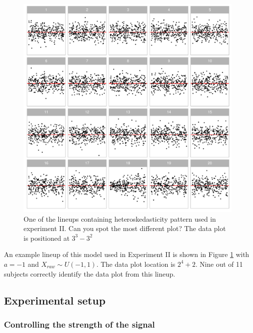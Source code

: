 \documentclass[]{interact}
\theoremstyle{plain}%
\theoremstyle{definition}
\theoremstyle{remark}
\begin{document}
\begin{figure}

{\centering \includegraphics[width=1\linewidth]{paper_comparison_files/figure-latex/example-heter-lineup-1} 

}

\caption{One of the lineups containing heteroskedasticity pattern used in experiment II. Can you spot the most different plot? The data plot is positioned at $3^3 - 3^2$}\label{fig:example-heter-lineup}
\end{figure}

An example lineup of this model used in Experiment II is shown in Figure
\ref{fig:example-heter-lineup} with \(a = -1\) and
\(X_{raw} \sim U(-1, 1)\). The data plot location is \(2^4 + 2\). Nine
out of 11 subjects correctly identify the data plot from this lineup.

\hypertarget{experimental-setup}{%
\subsection{Experimental setup}\label{experimental-setup}}

\hypertarget{controlling-the-strength-of-the-signal}{%
\subsubsection{Controlling the strength of the
signal}\label{controlling-the-strength-of-the-signal}}
\end{document}
